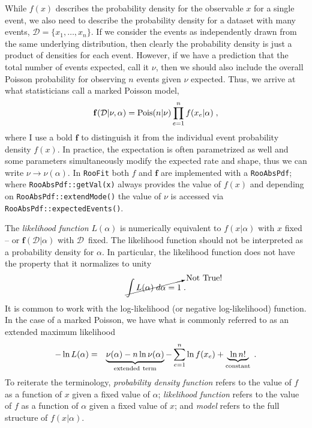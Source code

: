 \documentclass{cernrep}
\newcommand{\Pois}{{\ensuremath{\rm Pois}}}
\newcommand{\data}{{\ensuremath{\mathcal{D}}}}
\newcommand{\F}{{\ensuremath{\mathbf{f}}}}
\begin{document}
While $f(x)$ describes the probability density for the observable $x$ for a single event, we also need to describe the probability density for a dataset with many events, $\data = \{x_1,\dots,x_{n}\}$.  If we consider the events as independently drawn from the same underlying distribution, then clearly the probability density is just a product of densities for each event.  However, if we have  a prediction that the total number of events expected, call it $\nu$, then we should also include the overall Poisson probability for observing $n$ events given $\nu$ expected.  Thus, we arrive at what statisticians call a marked Poisson model,
\begin{equation}
\label{Eq:markedPoisson}
\F(\data|\nu,\alpha) = \Pois(n|\nu) \prod_{e=1}^n f(x_e|\alpha) \; ,
\end{equation}
where I use a bold $\F$ to distinguish it from the individual event probability density $f(x)$.  In practice, the expectation is often parametrized as well and some parameters simultaneously modify the expected rate and shape, thus we can write $\nu\rightarrow\nu(\alpha)$.  In \texttt{RooFit} both $f$ and $\F$ are implemented with a \texttt{RooAbsPdf}; where \texttt{RooAbsPdf::getVal(x)} always provides the value of $f(x)$ and depending on \texttt{RooAbsPdf::extendMode()} the value of $\nu$ is accessed via \texttt{RooAbsPdf::expectedEvents()}.

The \emph{likelihood function} $L(\alpha)$ is numerically equivalent to $f(x|\alpha)$ with $x$ fixed -- or $\F(\data|\alpha)$ with \data\ fixed.  The likelihood function should not be interpreted as a probability density for $\alpha$.  In particular, the likelihood function does not have the property that it normalizes to unity
\[
\cancelto{\mathrm{Not ~True!}}{\int L(\alpha) \;d\alpha = 1}\; .
\]
%
It is common to work with the log-likelihood (or negative log-likelihood) function.  In the case of a marked Poisson, we have what is commonly referred to as an extended maximum likelihood~\cite{Barlow1990496}
\begin{eqnarray}\nonumber
-\ln L( \alpha) &=& \underbrace{\nu(\alpha) - n \ln \nu(\alpha)}_{\rm extended~term} - \sum_{e=1}^n \ln f(x_e)   + \underbrace{~\ln n! ~}_{\mathrm{constant}}\; .
\end{eqnarray}
To reiterate the terminology, \emph{probability density function} refers to the value of $f$ as a function of $x$ given a fixed value of $\alpha$; \emph{likelihood function} refers to the value of $f$ as a function of $\alpha$ given a fixed value of $x$; and \emph{model} refers to the full structure of $f(x|\alpha)$.
\end{document}
